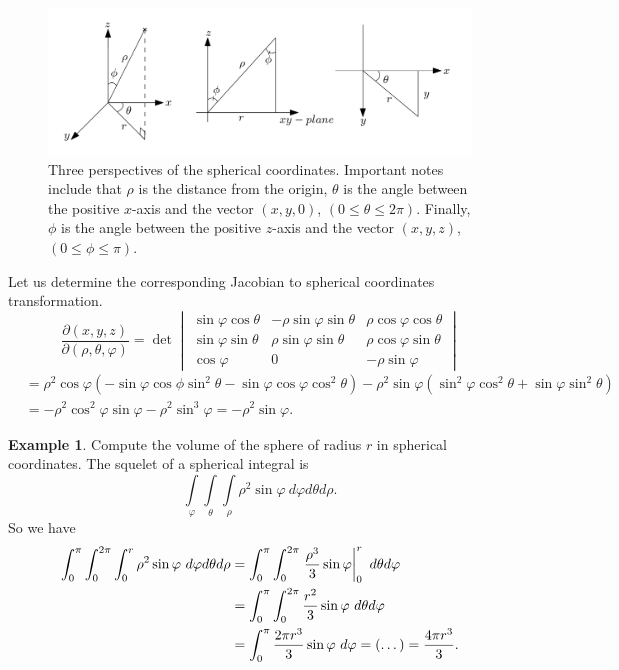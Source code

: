 \documentclass[
	12pt,
	]{article}
\newcommand{\vphi}{\varphi}
\theoremstyle{custom}
\theoremstyle{custom}
\theoremstyle{custom}
\theoremstyle{custom}
\theoremstyle{custom}
\theoremstyle{definition}
\newtheorem{example}{Example}[section]
\theoremstyle{example}
\theoremstyle{note}
\theoremstyle{remark}
\theoremstyle{example}
\newcounter{theo}[section]\setcounter{theo}{0}
\numberwithin{equation}{subsection}
\begin{document}
  		\begin{figure}[H]
  			\centering
  			\includegraphics[width= 0.8\linewidth]{MATH314_Notes_Triple_Integral_Example3_Figure.png}
  			\captionsetup{margin=1cm, justification=raggedright}\caption{Three perspectives of the spherical coordinates. Important notes include that $\rho$ is the distance from the origin, $\theta$ is the angle between the positive $x$-axis and the vector $(x,y,0)$, $(0\le \theta \le 2\pi)$. Finally, $\phi$ is the angle between the positive $z$-axis and the vector $(x,y,z)$, $(0 \le \phi \le \pi)$.}
  		\end{figure}
  		Let us determine the corresponding Jacobian to spherical coordinates transformation. 
  		\begin{equation*}
  			\frac{\partial (x,y,z)}{\partial (\rho, \theta, \vphi)}  = 
  			\det\begin{vmatrix}
  				\sin\vphi \cos \theta & -\rho \sin \vphi \sin \theta & \rho \cos \vphi \cos \theta \\
  				\sin\vphi \sin \theta & \rho \sin \vphi \sin \theta & \rho \cos \vphi \sin \theta \\
  				\cos \vphi & 0 & -\rho \sin \vphi
  			\end{vmatrix}
  		\end{equation*}
  		\begin{align*}
  			&= \rho^{2} \cos \vphi (-\sin\vphi \cos \phi \sin ^{2}\theta - \sin \vphi\cos \vphi \cos^{2}\theta )- \rho^{2}\sin \vphi(\sin^{2}\vphi \cos^{2} \theta + \sin \vphi \sin^{2 }\theta) \\
  			&= -\rho^{2}\cos^{2} \vphi \sin \vphi - \rho^{2}\sin^{3}\vphi = \boxed{-\rho^{2}\sin \vphi} .
  		\end{align*}
  		
  		\begin{example}
  			Compute the volume of the sphere of radius $r$ in spherical coordinates.
  			The squelet of a spherical integral is 
  			$$\int\limits_{\vphi} \int\limits_{\theta}\int\limits_{\rho} \rho^{2} \sin \vphi \ d\vphi d\theta d\rho.$$
  			So we have 
  			\begin{align*}
  				\int_{0}^{\pi} \int_{0}^{2\pi} \int_{0}^{r} \rho^{2}\sin \vphi \ d\vphi d\theta d \rho &= \int_{0}^{\pi} \int_{0}^{2\pi} \eval{\frac{\rho^{3}}{3} \sin \vphi}_{0}^{r} \ d\theta d \vphi \\
  				&=\int_{0}^{\pi}\int_{0}^{2\pi} \frac{r^{2}}{3}\sin \vphi \ d\theta d \vphi \\
  				&= \int_{0}^{\pi} \frac{2\pi r^{3}}{3} \sin \vphi \ d\vphi = (\dots ) = \frac{4\pi r^{3}}{3}.
  			\end{align*}
  		\end{example}
\end{document}
